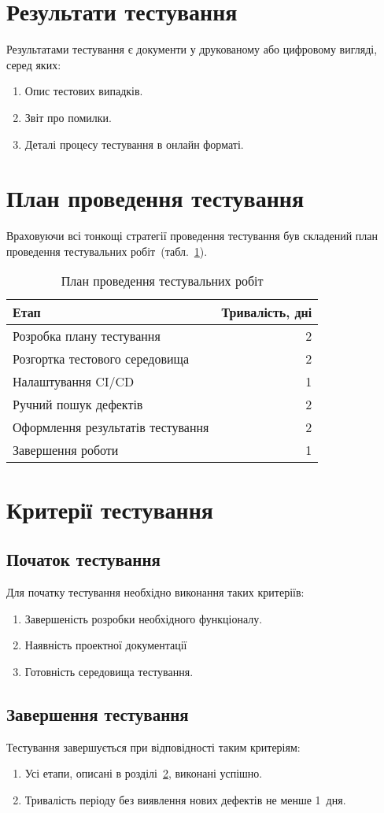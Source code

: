 \documentclass[a4paper,oneside,DIV=12,12pt]{scrartcl}
\begin{document}
	\section{Результати тестування}
		Результатами тестування є документи у друкованому або цифровому вигляді, серед яких:
		\begin{enumerate}
			\item Опис тестових випадків.
			\item Звіт про помилки.
			\item Деталі процесу тестування в онлайн форматі.
		\end{enumerate}
	
	\section{План проведення тестування}
		\label{sec:test-schedule}
		Враховуючи всі тонкощі стратегії проведення тестування був складений план проведення тестувальних робіт~(табл.~\ref{tab:testing-schedule}).
		\begin{longtable}{lr}
			\toprule
				Етап & Тривалість, дні\\
			\midrule
			\endhead
			\bottomrule
			\caption{План проведення тестувальних робіт\label{tab:testing-schedule}}
			\endfoot
			Розробка плану тестування & 2\\
			Розгортка тестового середовища & 2\\
			Налаштування CI/CD & 1\\
			Ручний пошук дефектів & 2\\
			Оформлення результатів тестування & 2\\
			Завершення роботи & 1\\
		\end{longtable}
		
	\section{Критерії тестування}
		\subsection{Початок тестування}
			Для початку тестування необхідно виконання таких критеріїв:
			\begin{enumerate}
				\item Завершеність розробки необхідного функціоналу.
				\item Наявність проектної документації
				\item Готовність середовища тестування.
			\end{enumerate}
			
		\subsection{Завершення тестування}
			Тестування завершується при відповідності таким критеріям:
			\begin{enumerate}
				\item Усі етапи, описані в розділі~\ref{sec:test-schedule}, виконані успішно.
				\item Тривалість періоду без виявлення нових дефектів не менше 1~дня.
			\end{enumerate}
\end{document}

